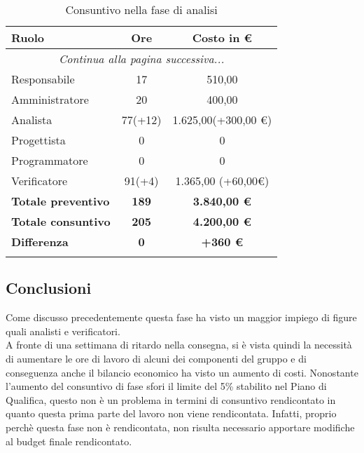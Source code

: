 \documentclass[../piano_di_progetto.tex]{subfiles}
\begin{document}
\begin{center}
	\begin{longtable}{|l|c|c|}
		\hline
		\rowcolor{lightgray}
		\textbf{Ruolo} & \textbf{Ore} & \textbf{Costo in €}\\
			
		\endhead
		
		\hline
		\multicolumn{3}{|c|}{\emph{Continua alla pagina successiva...}}\\
		\hline
		\endfoot

		\endlastfoot
		Responsabile &   17      & 510,00 \\
		\hline
		Amministratore & 20      & 400,00 \\
		\hline
		Analista &       77(+12) & 1.625,00(+300,00 €) \\
		\hline
		Progettista &    0       & 0 \\
		\hline
		Programmatore &  0       & 0 \\
		\hline
		Verificatore &   91(+4)      & 1.365,00 (+60,00€) \\
		\hline
		\textbf{Totale preventivo} & \textbf{189} & \textbf{3.840,00 €} \\
		\hline
		\textbf{Totale consuntivo} & \textbf{205	} & \textbf{4.200,00 €} \\
		\hline
		\textbf{Differenza} & \textbf{0} & \textbf{+360 €}\\
		\hline
		\rowcolor{white}
		\caption{Consuntivo nella fase di analisi}
	\end{longtable}
\end{center}

\subsection{ Conclusioni}%
\label{sub:cons_fine}
Come discusso precedentemente questa fase ha visto un maggior impiego di figure quali analisti e verificatori.\\
A fronte di una settimana di ritardo nella consegna, si è vista quindi la necessità di aumentare le ore di lavoro di alcuni dei componenti del gruppo e di conseguenza anche il bilancio economico ha visto un aumento di costi. Nonostante l'aumento del consuntivo di fase sfori il limite del 5\% stabilito nel Piano di Qualifica, questo non è un problema in termini di consuntivo rendicontato in quanto questa prima parte del lavoro non viene rendicontata. Infatti, proprio perchè questa fase non è rendicontata, non risulta necessario apportare modifiche al budget finale rendicontato.
\end{document}
